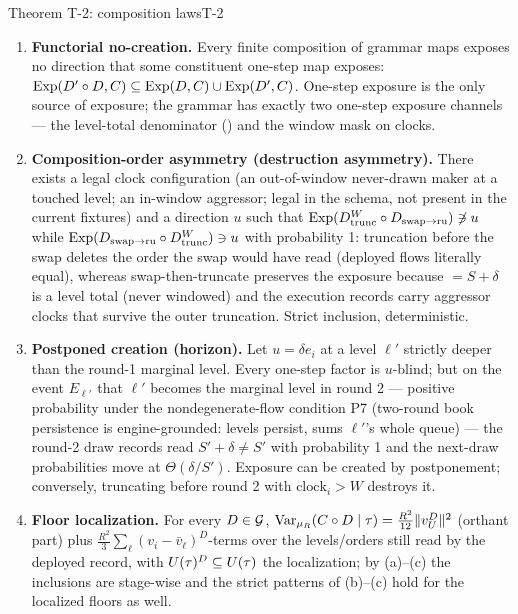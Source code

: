 \begin{preregthm}{Theorem T-2: composition laws}{T-2}
\label{thm:t3-t2}
\begin{enumerate}
\item[(a)] \textbf{Functorial no-creation.} Every finite composition of
grammar maps exposes no direction that some constituent one-step map
exposes: $\Exp(D' \circ D, \Ccons) \subseteq \Exp(D, \Ccons) \cup
\Exp(D', \Ccons)$. One-step exposure is the only source of exposure; the
grammar has exactly two one-step exposure channels --- the level-total
denominator () and the window mask on clocks.
\item[(b)] \textbf{Composition-order asymmetry (destruction asymmetry).}
There exists a legal clock configuration (an out-of-window never-drawn maker
at a touched level; an in-window aggressor; legal in the schema, not present
in the current fixtures) and a direction $u$ such that
$\Exp(\Dtrunc[W] \circ \Dswapru) \not\ni u$ while
$\Exp(\Dswapru \circ \Dtrunc[W]) \ni u$ with probability 1: truncation
before the swap deletes the order the swap would have read
(deployed flows literally equal), whereas swap-then-truncate preserves the
exposure because  $= S + \delta$ is a level total
(never windowed) and the execution records carry aggressor clocks that
survive the outer truncation. Strict inclusion, deterministic.
\item[(c)] \textbf{Postponed creation (horizon).} Let $u = \delta e_i$ at a
level $\ell'$ strictly deeper than the round-1 marginal level. Every
one-step factor is $u$-blind; but on the event $E_{\ell'}$ that $\ell'$
becomes the marginal level in round 2 --- positive probability under the
nondegenerate-flow condition P7 (two-round book persistence is
engine-grounded: levels persist,  sums $\ell'$'s whole
queue) --- the round-2 draw records read $S' + \delta \ne S'$ with
probability 1 and the next-draw probabilities move at $\Theta(\delta/S')$.
Exposure can be created by postponement; conversely, truncating before
round 2 with $\mathrm{clock}_i > W$ destroys it.
\item[(d)] \textbf{Floor localization.} For every $D \in \Gdep$,
$\mathrm{Var}_{\muR}(\Ccons \circ D \mid \tape) = \tfrac{R^2}{12}\|\vU^{D}\|^2$
(orthant part) plus $\tfrac{R^2}{3}\sum_{\ell}(v_i -
\bar{v}_\ell)^{D}$-terms over the levels/orders still read by the deployed
record, with $\Utau^{D} \subseteq \Utau$ the localization; by (a)--(c) the
inclusions are stage-wise and the strict patterns of (b)--(c) hold for the
localized floors as well.
\end{enumerate}
\end{preregthm}

